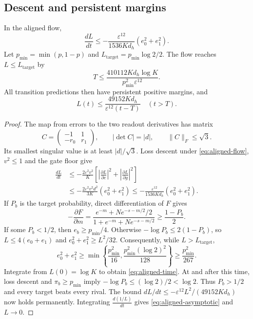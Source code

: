 \subsection{Descent and persistent margins}
\begin{lemma}
\label{lem:aligned-descent}
In the aligned flow,
\[
 \frac{dL}{dt}\le
 -\frac{\varepsilon^{12}}{1536K d_h}(e_0^2+e_1^2).
\]
Let $p_{\min}=\min(p,1-p)$ and $L_{\mathrm{target}}=p_{\min}\log2/2$.
The flow reaches $L\le L_{\mathrm{target}}$ by
\begin{equation}
 T\le\frac{410112K d_h\log K}{p_{\min}^2\varepsilon^{12}}.
 \label{eq:aligned-time}
\end{equation}
All transition predictions then have persistent positive margins, and
\begin{equation}
 L(t)\le\frac{49152K d_h}{\varepsilon^{12}(t-T)}\quad(t>T).
 \label{eq:aligned-asymptotic}
\end{equation}
\end{lemma}
\begin{proof}
The map from errors to the two readout derivatives has matrix
\[
 C=\begin{pmatrix}-1&1\\-r_0&r_1\end{pmatrix},\qquad
 |\det C|=|d|,\qquad \|C\|_F\le\sqrt3.
\]
Its smallest singular value is at least $|d|/\sqrt3$.
Loss descent under \cref{eq:aligned-flow}, $v^2\le1$ and the gate floor give
\[
\begin{aligned}
 \frac{dL}{dt}
 &\le-\frac{2\varepsilon^2v^2}{K}
 \left[\left|\frac{\partial L}{\partial c}\right|^2+
       \left|\frac{\partial L}{\partial g}\right|^2\right]\\
 &\le-\frac{2\varepsilon^2v^2d^2}{3K}(e_0^2+e_1^2)
 \le-\frac{\varepsilon^{12}}{1536K d_h}(e_0^2+e_1^2).
\end{aligned}
\]
If $P_b$ is the target probability, direct differentiation of $F$ gives
\[
 -\frac{\partial F}{\partial m}
 =\frac{e^{-m}+Ne^{-s-m/2}/2}{1+e^{-m}+Ne^{-s-m/2}}
 \ge\frac{1-P_b}{2}.
\]
If some $P_b<1/2$, then $e_b\ge p_{\min}/4$.
Otherwise $-\log P_b\le2(1-P_b)$, so $L\le4(e_0+e_1)$ and
$e_0^2+e_1^2\ge L^2/32$.
Consequently, while $L>L_{\mathrm{target}}$,
\[
 e_0^2+e_1^2\ge
 \min\left\{\frac{p_{\min}^2}{16},\frac{p_{\min}^2(\log2)^2}{128}\right\}
 \ge\frac{p_{\min}^2}{267}.
\]
Integrate from $L(0)=\log K$ to obtain \cref{eq:aligned-time}.
At and after this time, loss descent and $\pi_b\ge p_{\min}$ imply
$-\log P_b\le(\log2)/2<\log2$. Thus $P_b>1/2$ and every target beats every rival.
The bound $dL/dt\le-\varepsilon^{12}L^2/(49152K d_h)$ now holds permanently.
Integrating $\frac{d(1/L)}{dt}$ gives \cref{eq:aligned-asymptotic} and $L\to0$.
\end{proof}

